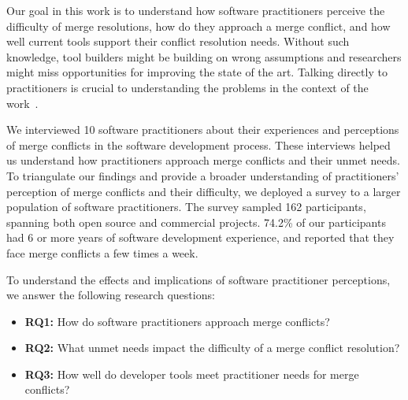 Our goal in this work is to understand how software practitioners perceive the difficulty of merge resolutions, how do they approach a merge conflict, and how well current tools support their conflict resolution needs. Without such knowledge, tool builders might be building on wrong assumptions and researchers might miss opportunities for improving the state of the art.
Talking directly to practitioners is crucial to understanding the problems in the context of the work~\cite{fritz2010using, sillito2006questions, de2008answering, ko2007information}.

We interviewed 10 software practitioners about their experiences and perceptions of merge conflicts in the software development process. These interviews helped us understand how practitioners approach merge conflicts and their unmet needs.
To triangulate our findings and provide a broader understanding of practitioners' perception of merge conflicts and their difficulty, we deployed a survey to a larger population of software practitioners.
The survey sampled 162 participants, spanning both open source and commercial projects. 74.2\% of our participants had 6 or more years of software development experience, and reported that they face merge conflicts a few times a week.

To understand the effects and implications of software practitioner perceptions, we answer the following research questions:

\begin{itemize}
\item \textbf{RQ1:} How do software practitioners approach merge conflicts?
\item \textbf{RQ2:} What unmet needs impact the difficulty of a merge conflict resolution?
\item \textbf{RQ3:} How well do developer tools meet practitioner needs for merge conflicts?
\end{itemize}

